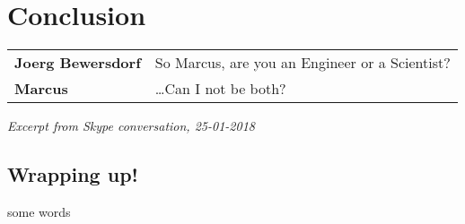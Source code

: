 \chapter{Conclusion}


\ifpdf
    \graphicspath{{Chapter6/Figs/Raster/}{Chapter6/Figs/PDF/}{Chapter6/Figs/}}
\else
    \graphicspath{{Chapter6/Figs/Vector/}{Chapter6/Figs/}}
\fi

\begin{tabular}{l l}
\textbf{Joerg Bewersdorf} & So Marcus, are you an Engineer or a Scientist? \\
\textbf{Marcus} & \ldots Can I not be both? 
\end{tabular}

\textit{Excerpt from Skype conversation, 25-01-2018}

\section{Wrapping up!}
some words
